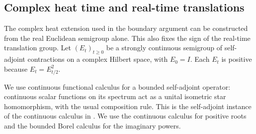 \subsection{Complex heat time and real-time translations}
\label{sec:complex-heat}
The complex heat extension used in the boundary argument can be constructed
from the real Euclidean semigroup alone. This also fixes the sign of the
real-time translation group. Let $(E_t)_{t\geq0}$ be a strongly continuous
semigroup of self-adjoint contractions on a complex Hilbert space, with
$E_0=I$. Each $E_t$ is positive because $E_t=E_{t/2}^2$.

We use continuous functional calculus for a bounded self-adjoint operator:
continuous scalar functions on its spectrum act as a unital isometric
star homomorphism, with the usual composition rule. This is the
self-adjoint instance of the continuous calculus in \cite[Theorem 2.19]{Williams}.
We use the continuous calculus for positive roots and the bounded Borel calculus for the imaginary powers.

